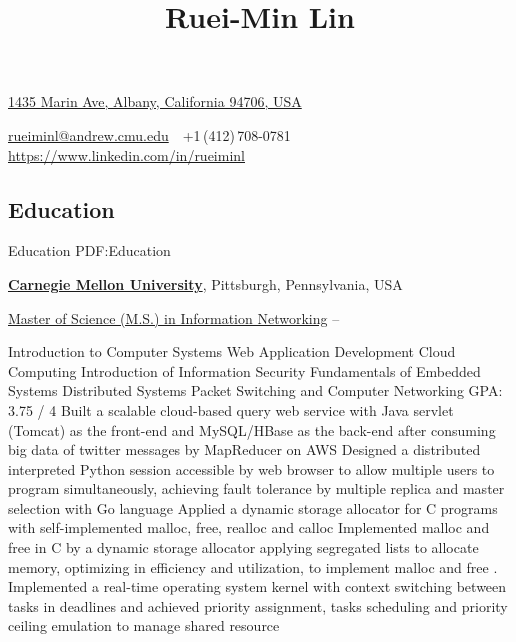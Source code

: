 \documentclass[a4paper,10pt,oneside]{article}
\begin{document}

\title{Ruei-Min Lin}

\begin{subtitle}
\href{https://www.google.com/maps/place/1435+Marin+Ave,+Albany,+CA+94706}
{1435 Marin Ave, Albany, California 94706, USA}
\par
\href{mailto:rueiminl@andrew.cmu.edu}
{rueiminl@andrew.cmu.edu}
\,\BulletSymbol\,
+1\,(412)\,708-0781
\,\BulletSymbol\,
\href{https://www.linkedin.com/in/rueiminl}
{https://www.linkedin.com/in/rueiminl}
\end{subtitle}

\begin{body}


\section{Education}
{Education}
{PDF:Education}

\href{http://www.cmu.edu/}
{\textbf{Carnegie Mellon University}},
Pittsburgh, Pennsylvania, USA


\SmallEntryGap
\href{http://www.ini.cmu.edu/degrees/msin/index.html}
{Master of Science (M.S.) in Information Networking}
\hfill
{} --

\begin{detail}

Introduction to Computer Systems
\hfill
Web Application Development
\hfill
Cloud Computing
\newline
Introduction of Information Security
\hfill
Fundamentals of Embedded Systems
\hfill
Distributed Systems
\newline
Packet Switching and Computer Networking
\hfill
GPA: 3.75 / 4
\BulletItem
Built a scalable cloud-based query web service with Java servlet (Tomcat) as the front-end and MySQL/HBase as the back-end after consuming big data of twitter messages by MapReducer on AWS
\BulletItem
Designed a distributed interpreted Python session accessible by web browser to allow multiple users to program simultaneously, achieving fault tolerance by multiple replica and master selection with Go language
\BulletItem
Applied a dynamic storage allocator for C programs with self-implemented malloc, free, realloc and calloc 
Implemented malloc and free in C by a dynamic storage allocator applying segregated lists to allocate memory, optimizing in efficiency and utilization,  to implement malloc and free .
\BulletItem
Implemented a real-time operating system kernel with context switching between tasks in deadlines and achieved priority assignment, tasks scheduling and priority ceiling emulation to manage shared resource
\BulletItem


\end{detail}
\end{body}
\end{document}
